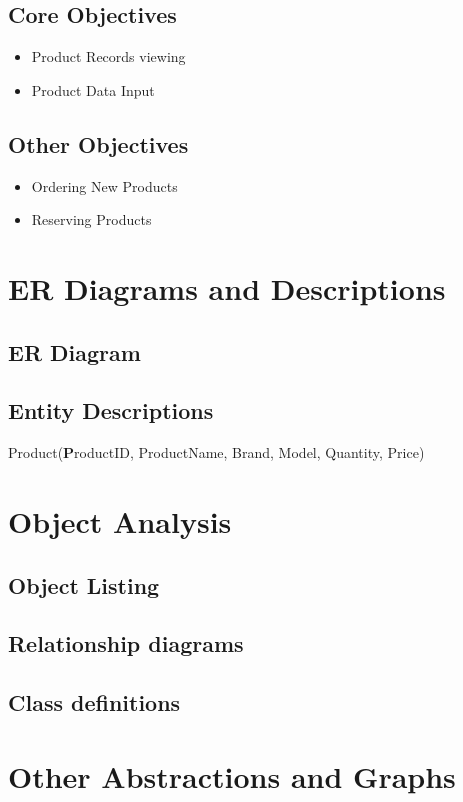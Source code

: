 \subsection{Core Objectives}
\begin{itemize}
	\item Product Records viewing
	\item Product Data Input
\end{itemize}
\subsection{Other Objectives}
\begin{itemize}
	\item Ordering New Products
	\item Reserving Products
\end{itemize}
\section{ER Diagrams and Descriptions}

\subsection{ER Diagram}

\subsection{Entity Descriptions}
Product(\textbf ProductID, ProductName, Brand, Model, Quantity, Price)
\section{Object Analysis}

\subsection{Object Listing}

\subsection{Relationship diagrams}

\subsection{Class definitions}

\section{Other Abstractions and Graphs}

